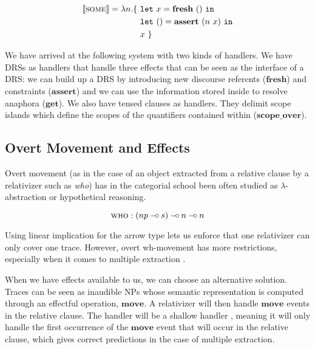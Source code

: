\documentclass{article}
\newcommand{\sem}[1]{\llbracket #1 \rrbracket}
\newcommand{\keyword}[1]{\texttt{#1}}
\newcommand{\effect}[1]{\textbf{#1}}
\def\limp {\mathbin{{-}\mkern-3.5mu{\circ}}}
\begin{document}
\vspace{-4mm}

\begin{align*}
  \sem{\textsc{some}} = \lambda n. \{\ 
    &\keyword{let}\ x = \effect{fresh}\ ()\ \keyword{in} \\
    &\keyword{let}\ () = \effect{assert}\ (n\ x)\ \keyword{in} \\
    &x \ \}
\end{align*}

We have arrived at the following system with two kinds of handlers. We have
DRSs as handlers that handle three effects that can be seen as the interface
of a DRS: we can build up a DRS by introducing new discourse referents
($\effect{fresh}$) and constraints ($\effect{assert}$) and we can use the
information stored inside to resolve anaphora ($\effect{get}$). We also have
tensed clauses as handlers. They delimit scope islands which define the scopes
of the quantifiers contained within ($\effect{scope\_over}$).

\subsection{Overt Movement and Effects}

Overt movement (as in the case of an object extracted from a relative clause
by a relativizer such as \emph{who}) has in the categorial school been often
studied as $\lambda$-abstraction or hypothetical reasoning.

\vspace{-3mm}

$$
\textsc{who} : (np \limp s) \limp n \limp n
$$

Using linear implication for the arrow type lets us enforce that one
relativizer can only cover one trace. However, overt wh-movement has more
restrictions, especially when it comes to multiple extraction
\citep{pogodalla2012controlling}.

When we have effects available to us, we can choose an alternative
solution. Traces can be seen as inaudible NPs whose semantic representation is
computed through an effectful operation, $\effect{move}$. A relativizer will
then handle $\effect{move}$ events in the relative clause. The handler will be
a shallow handler \citep{kammar2013handlers}, meaning it will only handle the
first occurrence of the $\effect{move}$ event that will occur in the relative
clause, which gives correct predictions in the case of multiple extraction.

\vspace{-4mm}
\end{document}
